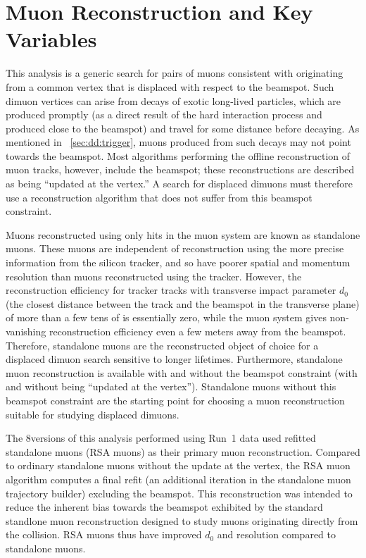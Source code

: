 \section{Muon Reconstruction and Key Variables}
This analysis is a generic search for pairs of muons consistent with originating from a common vertex that is displaced with respect to the beamspot.
Such dimuon vertices can arise from decays of exotic long-lived particles, which are produced promptly (as a direct result of the hard interaction process and produced close to the beamspot) and travel for some distance before decaying.
As mentioned in \Sec~\ref{sec:dd:trigger}, muons produced from such decays may not point towards the beamspot.
Most algorithms performing the offline reconstruction of muon tracks, however, include the beamspot; these reconstructions are described as being ``updated at the vertex.''
A search for displaced dimuons must therefore use a reconstruction algorithm that does not suffer from this beamspot constraint.

Muons reconstructed using only hits in the muon system are known as standalone muons.
These muons are independent of reconstruction using the more precise information from the silicon tracker, and so have poorer spatial and momentum resolution than muons reconstructed using the tracker.
However, the reconstruction efficiency for tracker tracks with transverse impact parameter $d_0$ (the closest distance between the track and the beamspot in the transverse plane) of more than a few tens of \cm is essentially zero, while the muon system gives non-vanishing reconstruction efficiency even a few meters away from the beamspot.
Therefore, standalone muons are the reconstructed object of choice for a displaced dimuon search sensitive to longer lifetimes.
Furthermore, standalone muon reconstruction is available with and without the beamspot constraint (\ie with and without being ``updated at the vertex'').
Standalone muons without this beamspot constraint are the starting point for choosing a muon reconstruction suitable for studying displaced dimuons.

The 8\TeV versions of this analysis performed using Run~1 data used refitted standalone muons (RSA muons) as their primary muon reconstruction.
Compared to ordinary standalone muons without the update at the vertex, the RSA muon algorithm computes a final refit (an additional iteration in the standalone muon trajectory builder) excluding the beamspot.
This reconstruction was intended to reduce the inherent bias towards the beamspot exhibited by the standard standlone muon reconstruction designed to study muons originating directly from the \pp collision.
RSA muons thus have improved $d_0$ and \pT resolution compared to standalone muons.

